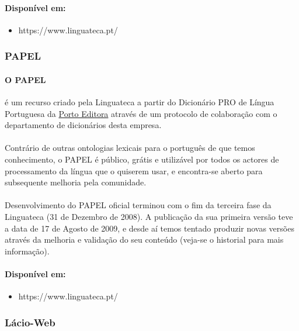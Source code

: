 \documentclass[a4paper, 10pt]{article}
\begin{document}
            	\paragraph{Disponível em:}
            	\begin{itemize}
				    \item https://www.linguateca.pt/

			    \end{itemize}
            \subsubsection{PAPEL}
            	\paragraph{O PAPEL} é um recurso criado pela Linguateca a partir do Dicionário PRO de Língua Portuguesa da \href{http://www.portoeditora.pt/}{Porto Editora} através de um protocolo de colaboração com o departamento de dicionários desta empresa.
				\paragraph{} Contrário de outras ontologias lexicais para o português de que temos conhecimento, o PAPEL é público, grátis e utilizável por todos os actores de processamento da língua que o quiserem usar, e encontra-se aberto para subsequente melhoria pela comunidade.
				\paragraph{} Desenvolvimento do PAPEL oficial terminou com o fim da terceira fase da Linguateca (31 de Dezembro de 2008). A publicação da sua primeira versão teve a data de 17 de Agosto de 2009, e desde aí temos tentado produzir novas versões através da melhoria e validação do seu conteúdo (veja-se o historial para mais informação).
				\paragraph{Disponível em:}
            	\begin{itemize}
				    \item https://www.linguateca.pt/

			    \end{itemize}

            \subsubsection{Lácio-Web}
\end{document}
